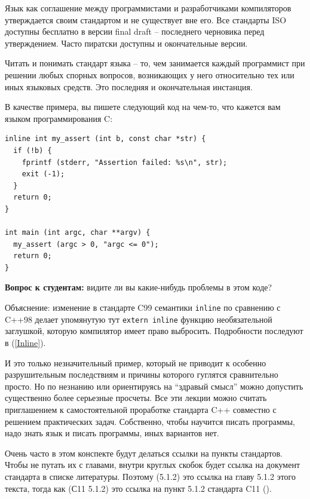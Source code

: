 \documentclass[a4paper,12pt,oneside]{book}
\newif\ifanswers
\begin{document}
Язык как соглашение между программистами и разработчиками компиляторов утверждается своим стандартом и не существует вне его. Все стандарты ISO доступны бесплатно в версии final draft – последнего черновика перед утверждением. Часто пиратски доступны и окончательные версии.

Читать и понимать стандарт языка – то, чем занимается каждый программист при решении любых спорных вопросов, возникающих у него относительно тех или иных языковых средств. Это последняя и окончательная инстанция.

В качестве примера, вы пишете следующий код на чем-то, что кажется вам языком программирования C:

\begin{lstlisting}
inline int my_assert (int b, const char *str) {
  if (!b) {
    fprintf (stderr, "Assertion failed: %s\n", str);
    exit (-1);
  }
  return 0;
}

int main (int argc, char **argv) {
  my_assert (argc > 0, "argc <= 0");
  return 0;
}
\end{lstlisting}

\textbf{Вопрос к студентам:} видите ли вы какие-нибудь проблемы в этом коде?

\ifanswers
Правильный ответ: проблемы есть. Этот код скомпилируется на GCC 4.9 и не скомпилируется на GCC 5.1 с опциями по умолчанию (проверьте, скомпилируется ли он на вашем любимом компиляторе).
\fi

Объяснение: изменение в стандарте C99 семантики \lstinline!inline! по сравнению с C++98 делает упомянутую тут \lstinline!extern inline! функцию необязательной заглушкой, которую компилятор имеет право выбросить. Подробности последуют в (\ref{Inline}).

И это только незначительный пример, который не приводит к особенно разрушительным последствиям и причины которого гуглятся сравнительно просто. Но по незнанию или ориентируясь на ``здравый смысл'' можно допустить существенно более серьезные просчеты. Все эти лекции можно считать приглашением к самостоятельной проработке стандарта C++ совместно с решением практических задач. Собственно, чтобы научится писать программы, надо знать язык и писать программы, иных вариантов нет.

Очень часто в этом конспекте будут делаться ссылки на пункты стандартов. Чтобы не путать их с главами, внутри круглых скобок будет ссылка на документ стандарта в списке литературы. Поэтому (5.1.2) это ссылка на главу 5.1.2 этого текста, тогда как (С11 5.1.2) это ссылка на пункт 5.1.2 стандарта C11 (\cite{stdc11}).
\end{document}
